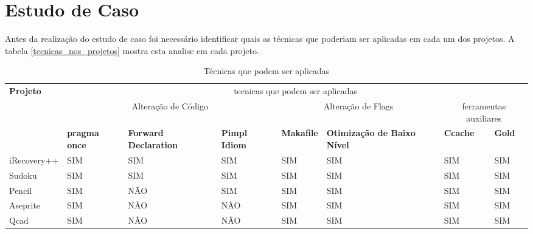 \section {Estudo de Caso}

Antes da realização do estudo de caso foi necessário identificar quais
 as técnicas que poderiam ser aplicadas em cada um dos projetos.
 A tabela \ref{tecnicas_nos_projetos} mostra esta analise em cada projeto.


\begin{table}[h]
\tiny
\begin{tabular}{p{1cm}p{2cm}p{2cm}p{2cm}p{2cm}p{2cm}p{2cm}p{2cm}}
\toprule
\textbf{Projeto} & \multicolumn{7}{c}{tecnicas que podem ser aplicadas} \\ 
 & \multicolumn{3}{c}{Alteração de Código} & \multicolumn{2}{c}{Alteração de Flags} & \multicolumn{2}{c}{ferramentas auxiliares}  \\ \midrule 
& \textbf{pragma once} & \textbf{Forward Declaration} & \textbf{Pimpl Idiom} & \textbf{Makafile} &
 \textbf{Otimização de Baixo Nível} & \textbf{Ccache} & \textbf{Gold} \\ \midrule
iRecovery++ & SIM & SIM & SIM &  SIM & SIM & SIM & SIM \\ \midrule
Sudoku &  SIM & SIM & SIM & SIM & SIM & SIM & SIM \\ \midrule
Pencil & SIM & NÃO &  SIM & SIM & SIM & SIM & SIM \\ \midrule
Aseprite &  SIM & NÃO & NÃO & SIM & SIM & SIM & SIM \\ \midrule
Qcad &  SIM & NÃO & NÃO & SIM & SIM & SIM & SIM \\ \bottomrule
\end{tabular} 
\caption{Técnicas que podem ser aplicadas}
\label{tecnicas_que_podem_ser_aplicadas}
\end{table}



